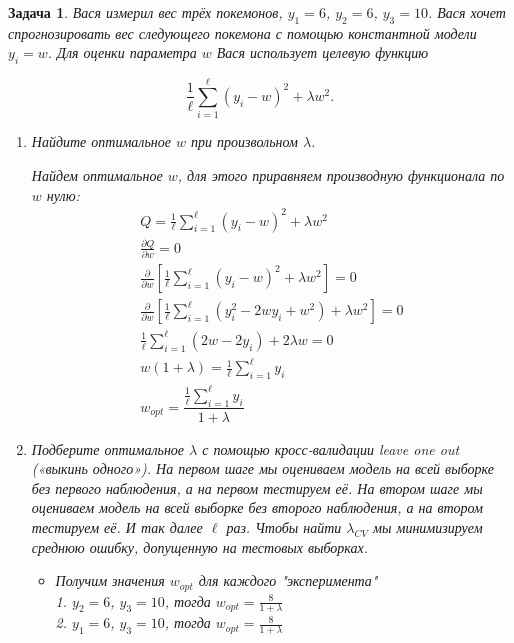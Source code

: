 \documentclass[a4paper,12pt]{article}
\theoremstyle{mystyle}
\newtheorem{esProblem}{Задача}
\begin{document}
\begin{esProblem}
Вася измерил вес трёх покемонов,  $y_1=6$, $y_2=6$, $y_3=10$.  Вася хочет спрогнозировать вес следующего покемона с помощью константной модели $y_i = w$. Для оценки параметра $w$ Вася использует целевую функцию

\begin{equation*} 
    \frac{1}{\ell}\sum_{i=1}^{\ell} (y_i - w)^2 + \lambda w^2.
\end{equation*} 

\begin{enumerate}
    \item Найдите оптимальное $w$ при произвольном $\lambda$. 
    
    Найдем оптимальное $w$, для этого приравняем производную функционала по $w$ нулю: \\
    \[
\begin{gathered}
	Q =  \frac{1}{\ell}\sum_{i=1}^{\ell} (y_i - w)^2 + \lambda w^2 \\
    \frac{\partial Q}{\partial w} = 0 \\
    \frac{\partial}{\partial w} \left[\frac{1}{\ell} \sum_{i=1}^{\ell} (y_i - w)^2 + \lambda w^2\right] = 0 \\
    \frac{\partial}{\partial w} \left[\frac{1}{\ell} \sum_{i=1}^{\ell} (y_i^2 - 2wy_i + w^2) + \lambda w^2\right] = 0 \\
    \frac{1}{\ell} \sum_{i=1}^{\ell} (2w - 2y_i) + 2\lambda w = 0 \\
    w(1 + \lambda) =  \frac{1}{\ell} \sum_{i=1}^{\ell} y_i \\
    w_{opt} = \dfrac{\frac{1}{\ell} \sum_{i=1}^{\ell} y_i}{1 + \lambda}
\end{gathered}
\]
    \item Подберите оптимальное $\lambda$ с помощью кросс-валидации leave one out («выкинь одного»). На первом шаге мы оцениваем модель на всей выборке без первого наблюдения, а на первом тестируем её. На втором шаге мы оцениваем модель на всей выборке без второго наблюдения, а на втором тестируем её. И так далее $\ell$ раз. Чтобы найти $\lambda_{CV}$ мы минимизируем среднюю ошибку, допущенную на тестовых выборках.
    \begin{itemize}
    \item Получим значения $w_{opt}$ для каждого "эксперимента" \\
    1. $y_2 = 6$, $y_3 = 10$, тогда $w_{opt} = \frac{8}{1 + \lambda}$ \\
    2.  $y_1 = 6$, $y_3 = 10$, тогда $w_{opt} = \frac{8}{1 + \lambda}$ \\

\end{itemize}
\end{enumerate}
\end{esProblem}
\end{document}
